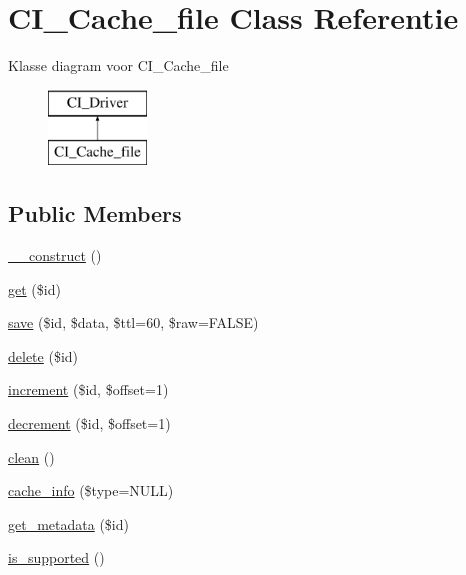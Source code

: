 \hypertarget{class_c_i___cache__file}{}\section{C\+I\+\_\+\+Cache\+\_\+file Class Referentie}
\label{class_c_i___cache__file}
Klasse diagram voor C\+I\+\_\+\+Cache\+\_\+file\begin{figure}[H]
\begin{center}
\leavevmode
\includegraphics[height=2.000000cm]{class_c_i___cache__file}
\end{center}
\end{figure}
\subsection*{Public Members}
\begin{DoxyCompactItemize}
\item 
\mbox{\hyperlink{class_c_i___cache__file_a095c5d389db211932136b53f25f39685}{\+\_\+\+\_\+construct}} ()
\item 
\mbox{\hyperlink{class_c_i___cache__file_a50e3bfb586b2f42932a6a93f3fbb0828}{get}} (\$id)
\item 
\mbox{\hyperlink{class_c_i___cache__file_a472645db04a8ce4b040b789a3062a7d2}{save}} (\$id, \$data, \$ttl=60, \$raw=F\+A\+L\+SE)
\item 
\mbox{\hyperlink{class_c_i___cache__file_a2f8258add505482d7f00ea26493a5723}{delete}} (\$id)
\item 
\mbox{\hyperlink{class_c_i___cache__file_a2f07a4e09b57f4460d49852497d1808f}{increment}} (\$id, \$offset=1)
\item 
\mbox{\hyperlink{class_c_i___cache__file_a4eb1c2772c8efc48c411ea060dd040b7}{decrement}} (\$id, \$offset=1)
\item 
\mbox{\hyperlink{class_c_i___cache__file_adb40b812890a8bc058bf6b7a0e1a54d9}{clean}} ()
\item 
\mbox{\hyperlink{class_c_i___cache__file_aa8b9c4d9f0387156736ccd8850f0727e}{cache\+\_\+info}} (\$type=N\+U\+LL)
\item 
\mbox{\hyperlink{class_c_i___cache__file_a59635cf18e997c5141bffa05ff7622e0}{get\+\_\+metadata}} (\$id)
\item 
\mbox{\hyperlink{class_c_i___cache__file_a98c68fd153468bc148c4ed8c716859fc}{is\+\_\+supported}} ()
\end{DoxyCompactItemize}
